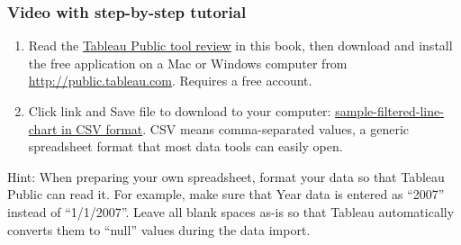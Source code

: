 \documentclass[
  english,
]{book}
\begin{document}
\hypertarget{video-with-step-by-step-tutorial-2}{%
\subsubsection*{Video with step-by-step tutorial}\label{video-with-step-by-step-tutorial-2}}

\begin{enumerate}
\def\labelenumi{\arabic{enumi})}
\item
  Read the \href{tableau-public}{Tableau Public tool review} in this book, then download and install the free application on a Mac or Windows computer from \url{http://public.tableau.com}. Requires a free account.
\item
  Click link and Save file to download to your computer: \href{data/sample-filtered-line-chart.csv}{sample-filtered-line-chart in CSV format}. CSV means comma-separated values, a generic spreadsheet format that most data tools can easily open.
\end{enumerate}

Hint: When preparing your own spreadsheet, format your data so that Tableau Public can read it. For example, make sure that Year data is entered as ``2007'' instead of ``1/1/2007''. Leave all blank spaces as-is so that Tableau automatically converts them to ``null'' values during the data import.
\end{document}
